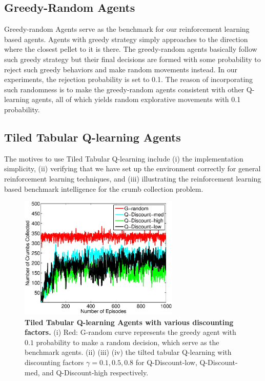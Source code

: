 \documentclass[conference]{IEEEtran}
\begin{document}
\subsection{Greedy-Random Agents} 
Greedy-random Agents serve as the benchmark for our reinforcement
learning based agents.
Agents with greedy strategy simply approaches to the direction where the
closest pellet to it is there.
The greedy-random agents basically follow such greedy strategy but 
their final decisions are formed with some probability to reject such greedy
behaviors and make random movements instead. 
In our experiments, the rejection probability is set to 0.1.
The reason of incorporating such randomness is to make the greedy-random agents
consistent with other Q-learning agents, all of which yields random
explorative movements with 0.1 probability.

\subsection{Tiled Tabular Q-learning Agents}
The motives to use Tiled Tabular Q-learning include
(i) the implementation simplicity,
(ii) verifying that we have set up the environment correctly for general
reinforcement learning techniques, and 
(iii) illustrating the reinforcement learning based benchmark intelligence
for the crumb collection problem.

\begin{figure}[t]
\centering
\includegraphics[width=3.0in]{./figures/RL/init_setup2.eps}
\caption{\textbf{Tiled Tabular Q-learning Agents with various discounting factors.} (i) Red: G-random curve
    represents the greedy agent with $0.1$ probability to make a random
    decision, which serve as the benchmark agents. 
    (ii) (iii) (iv) the tilted tabular Q-learning with discounting factors
    $\gamma = 0.1, 0.5, 0.8$ for Q-Discount-low, Q-Discount-med, and
    Q-Discount-high respectively.}
\label{fig:RL_init2}
\end{figure}
\end{document}
